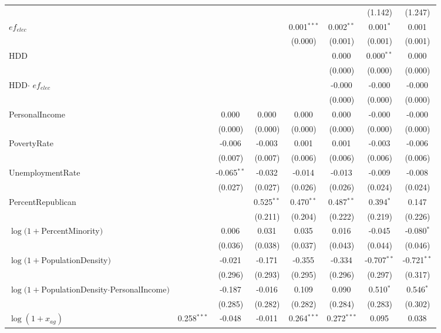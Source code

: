 \begin{longtable}[h]{lccccccc}
  & & & & & & (1.142) & (1.247) \\
$ef_{elec}$ & & & & 0.001$^{***}$ & 0.002$^{**}$ & 0.001$^{*}$ & 0.001$^{}$ \\
  & & & & (0.000) & (0.001) & (0.001) & (0.001) \\
HDD & & & & & 0.000$^{}$ & 0.000$^{**}$ & 0.000$^{}$ \\
  & & & & & (0.000) & (0.000) & (0.000) \\
HDD$\cdot$ $ef_{elec}$ & & & & & -0.000$^{}$ & -0.000$^{}$ & -0.000$^{}$ \\
  & & & & & (0.000) & (0.000) & (0.000) \\
PersonalIncome & & 0.000$^{}$ & 0.000$^{}$ & 0.000$^{}$ & 0.000$^{}$ & -0.000$^{}$ & -0.000$^{}$ \\
  & & (0.000) & (0.000) & (0.000) & (0.000) & (0.000) & (0.000) \\
PovertyRate & & -0.006$^{}$ & -0.003$^{}$ & 0.001$^{}$ & 0.001$^{}$ & -0.003$^{}$ & -0.006$^{}$ \\
  & & (0.007) & (0.007) & (0.006) & (0.006) & (0.006) & (0.006) \\
UnemploymentRate & & -0.065$^{**}$ & -0.032$^{}$ & -0.014$^{}$ & -0.013$^{}$ & -0.009$^{}$ & -0.008$^{}$ \\
  & & (0.027) & (0.027) & (0.026) & (0.026) & (0.024) & (0.024) \\
PercentRepublican & & & 0.525$^{**}$ & 0.470$^{**}$ & 0.487$^{**}$ & 0.394$^{*}$ & 0.147$^{}$ \\
  & & & (0.211) & (0.204) & (0.222) & (0.219) & (0.226) \\
$\log(1 + $PercentMinority$)$ & & 0.006$^{}$ & 0.031$^{}$ & 0.035$^{}$ & 0.016$^{}$ & -0.045$^{}$ & -0.080$^{*}$ \\
  & & (0.036) & (0.038) & (0.037) & (0.043) & (0.044) & (0.046) \\
$\log(1 + $PopulationDensity$)$ & & -0.021$^{}$ & -0.171$^{}$ & -0.355$^{}$ & -0.334$^{}$ & -0.707$^{**}$ & -0.721$^{**}$ \\
  & & (0.296) & (0.293) & (0.295) & (0.296) & (0.297) & (0.317) \\
$\log(1 + $PopulationDensity$ \cdot $PersonalIncome$)$ & & -0.187$^{}$ & -0.016$^{}$ & 0.109$^{}$ & 0.090$^{}$ & 0.510$^{*}$ & 0.546$^{*}$ \\
  & & (0.285) & (0.282) & (0.282) & (0.284) & (0.283) & (0.302) \\
$\log(1 + x_{ag})$ & 0.258$^{***}$ & -0.048$^{}$ & -0.011$^{}$ & 0.264$^{***}$ & 0.272$^{***}$ & 0.095$^{}$ & 0.038$^{}$ \\

\end{longtable}
